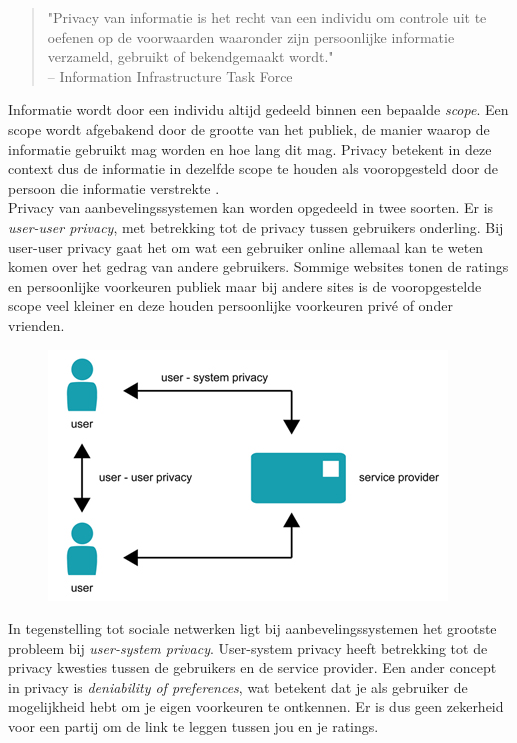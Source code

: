  \begin{quotation}
"Privacy van informatie is het recht van een individu om controle uit te oefenen op de voorwaarden waaronder zijn persoonlijke informatie verzameld, gebruikt of bekendgemaakt wordt." \\-- Information Infrastructure Task Force \cite{pirs}
 \end{quotation}
Informatie wordt door een individu altijd gedeeld binnen een bepaalde \textit{scope}. Een scope wordt afgebakend door de grootte van het publiek, de manier waarop de informatie gebruikt mag worden en hoe lang dit mag.  Privacy betekent in deze context dus de informatie in dezelfde scope te houden als vooropgesteld door de persoon die informatie verstrekte \cite{pirs}.\\
Privacy van aanbevelingssystemen kan worden opgedeeld in twee soorten. Er is \textit{user-user privacy}, met betrekking tot de privacy tussen gebruikers onderling. Bij user-user privacy gaat het om wat een gebruiker online allemaal kan te weten komen over het gedrag van andere gebruikers. Sommige websites tonen de ratings en persoonlijke voorkeuren publiek maar bij andere sites is de vooropgestelde scope veel kleiner en deze houden persoonlijke voorkeuren priv\'e of onder vrienden.  

\begin{figure}[htpb]   
    \label{Figuur::usersystemprivacy}      
  \begin{center}    
 \includegraphics[scale=0.6,keepaspectratio]{fig/user-user-system-privacy}    
  \end{center}     
   \end{figure}
   
In tegenstelling tot sociale netwerken ligt bij aanbevelingssystemen het grootste probleem bij \textit{user-system privacy}. User-system privacy heeft betrekking tot de privacy kwesties tussen de gebruikers en de service provider. Een ander concept in privacy is \emph{deniability of preferences}, wat betekent dat je als gebruiker de mogelijkheid hebt om je eigen voorkeuren te ontkennen. Er is dus geen zekerheid voor een partij om de link te leggen tussen jou en je ratings.

